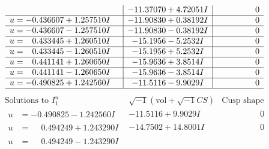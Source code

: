 \documentclass[1p]{elsarticle_modified}
\theoremstyle{definition}
\newcommand{\I}{\sqrt{-1}}
\begin{document}
$$\begin{array}{c|c|c}
 & -11.37070 + 4.72051 I & \phantom{-0.000000 } 0 \\ \hline\begin{aligned}
u &= -0.436607 + 1.257510 I\end{aligned}
 & -11.90830 + 0.38192 I & \phantom{-0.000000 } 0 \\ \hline\begin{aligned}
u &= -0.436607 - 1.257510 I\end{aligned}
 & -11.90830 - 0.38192 I & \phantom{-0.000000 } 0 \\ \hline\begin{aligned}
u &= \phantom{-}0.433445 + 1.260510 I\end{aligned}
 & -15.1956 - 5.2532 I & \phantom{-0.000000 } 0 \\ \hline\begin{aligned}
u &= \phantom{-}0.433445 - 1.260510 I\end{aligned}
 & -15.1956 + 5.2532 I & \phantom{-0.000000 } 0 \\ \hline\begin{aligned}
u &= \phantom{-}0.441141 + 1.260650 I\end{aligned}
 & -15.9636 + 3.8514 I & \phantom{-0.000000 } 0 \\ \hline\begin{aligned}
u &= \phantom{-}0.441141 - 1.260650 I\end{aligned}
 & -15.9636 - 3.8514 I & \phantom{-0.000000 } 0 \\ \hline\begin{aligned}
u &= -0.490825 + 1.242560 I\end{aligned}
 & -11.5116 - 9.9029 I & \phantom{-0.000000 } 0\\
 \hline 
 \end{array}$$\newpage$$\begin{array}{c|c|c}  
\text{Solutions to }I^u_{1}& \I (\text{vol} + \sqrt{-1}CS) & \text{Cusp shape}\\
 \hline 
\begin{aligned}
u &= -0.490825 - 1.242560 I\end{aligned}
 & -11.5116 + 9.9029 I & \phantom{-0.000000 } 0 \\ \hline\begin{aligned}
u &= \phantom{-}0.494249 + 1.243290 I\end{aligned}
 & -14.7502 + 14.8001 I & \phantom{-0.000000 } 0 \\ \hline\begin{aligned}
u &= \phantom{-}0.494249 - 1.243290 I\end{aligned}

\end{array}$$
\end{document}
